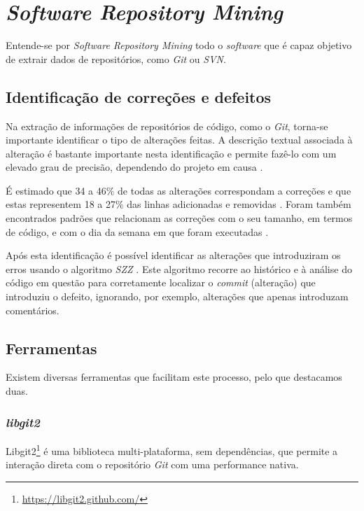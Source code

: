 \section{\emph{Software Repository Mining}}

Entende-se por \emph{Software Repository Mining} todo o \emph{software} que é capaz objetivo de extrair dados de repositórios, como \emph{Git} ou \emph{SVN}.

\subsection{Identificação de correções e defeitos}

Na extração de informações de repositórios de código, como o \emph{Git}, torna-se importante identificar o tipo de alterações feitas. A descrição textual associada à alteração é bastante importante nesta identificação e permite fazê-lo com um elevado grau de precisão, dependendo do projeto em causa \cite{Mockus2000}.

É estimado que 34 a 46\% de todas as alterações correspondam a correções e que estas representem 18 a 27\% das linhas adicionadas e removidas \cite{Mockus2000}. Foram também encontrados padrões que relacionam as correções com o seu tamanho, em termos de código, e com o dia da semana em que foram executadas \cite{Sliwerski2005}.

Após esta identificação é possível identificar as alterações que introduziram os erros usando o algoritmo \emph{SZZ} \cite{Sliwerski2005}. Este algoritmo recorre ao histórico e à análise do código em questão para corretamente localizar o \emph{commit} (alteração) que introduziu o defeito, ignorando, por exemplo, alterações que apenas introduzam comentários.

\subsection{Ferramentas}

Existem diversas ferramentas que facilitam este processo, pelo que destacamos duas.

\subsubsection{\emph{libgit2}}

Libgit2\footnote{\url{https://libgit2.github.com/}} é uma biblioteca multi-plataforma, sem dependências, que permite a interação direta com o repositório \emph{Git} com uma performance nativa.

